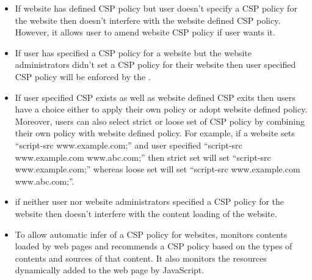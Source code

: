 \begin{itemize}

\item If website has defined CSP policy but user doesn't specify a CSP
  policy for the website then \codename doesn't interfere with the
  website defined CSP policy. However, it allows user to amend
  website CSP policy if user wants it.

\item If user has specified a CSP policy for a website but the website
  administrators didn't set a CSP policy for their website then user
  specified CSP policy will be enforced by the \codename.
 
\item If user specified CSP exists as well as website defined CSP
  exits then users have a choice either to apply their own policy or
  adopt website defined policy. Moreover, users can also select strict or
  loose set of CSP policy by combining their own policy with website
  defined policy. For example, if a website sets ``script-src
  www.example.com;'' and user specified ``script-src www.example.com
  www.abc.com;'' then strict set will set ``script-src
  www.example.com;'' whereas loose set will set ``script-src
  www.example.com www.abc.com;''.

\item if neither user nor website administrators specified a CSP
  policy for the website then \codename doesn't interfere with the
  content loading of the website. 

\item To allow automatic infer of a CSP policy for websites, \codename
  monitors contents loaded by web pages and recommends a CSP policy
  based on the types of contents and sources of that content. It also
  monitors the resources dynamically added to the web page by
  JavaScript.

\end{itemize}
